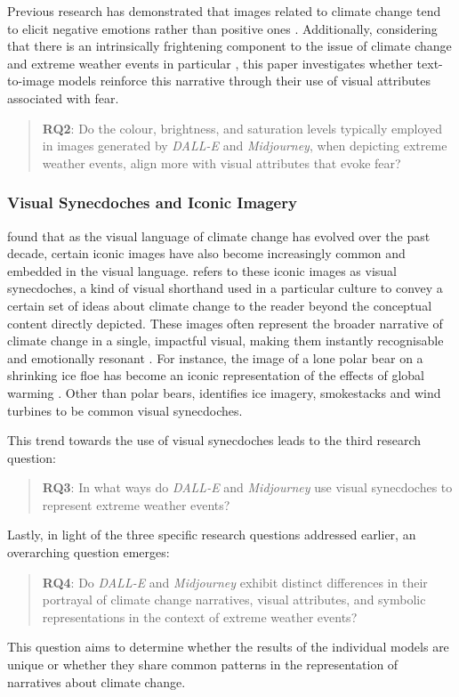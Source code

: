 Previous research has demonstrated that images related to climate change tend to elicit negative emotions rather than positive ones \parencite{ONeill2017}. Additionally, considering that there is an intrinsically frightening component to the issue of climate change and extreme weather events in particular \parencite{Soutar2022}, this paper investigates whether text-to-image models reinforce this narrative through their use of visual attributes associated with fear.
\begin{quote}
\textbf{RQ2}: Do the colour, brightness, and saturation levels typically employed in images generated by \textit{DALL-E} and \textit{Midjourney}, when depicting extreme weather events, align more with visual attributes that evoke fear? 
\end{quote}
\subsubsection{Visual Synecdoches and Iconic Imagery}

\textcite[16]{ONeill2019} found that as the visual language of climate change has evolved over the past decade, certain iconic images have also become increasingly common and embedded in the visual language. \textcite[17]{ONeill2019} refers to these iconic images as visual synecdoches, a kind of visual shorthand used in a particular culture to convey a certain set of ideas about climate change  to the reader beyond the conceptual content directly depicted. These images often represent the broader narrative of climate change in a single, impactful visual, making them instantly recognisable and emotionally resonant \parencite[78]{ONeill2014}. For instance, the image of a lone polar bear on a shrinking ice floe has become an iconic representation of the effects of global warming \parencite[18]{ONeill2019}. Other than polar bears, \textcite[16]{ONeill2019} identifies ice imagery, smokestacks and wind turbines to be common visual synecdoches.

This trend towards the use of visual synecdoches leads to the third research question:
 \begin{quote}
\textbf{RQ3}: In what ways do \textit{DALL-E} and \textit{Midjourney} use visual synecdoches to represent extreme weather events?

 \end{quote}

Lastly, in light of the three specific research questions addressed earlier, an overarching question emerges:

\begin{quote}
\textbf{RQ4}: Do \textit{DALL-E} and \textit{Midjourney} exhibit distinct differences in their portrayal of climate change narratives, visual attributes, and symbolic representations in the context of extreme weather events?
\end{quote}

This question aims to determine whether the results of the individual models are unique or whether they share common patterns in the representation of narratives about climate change.





